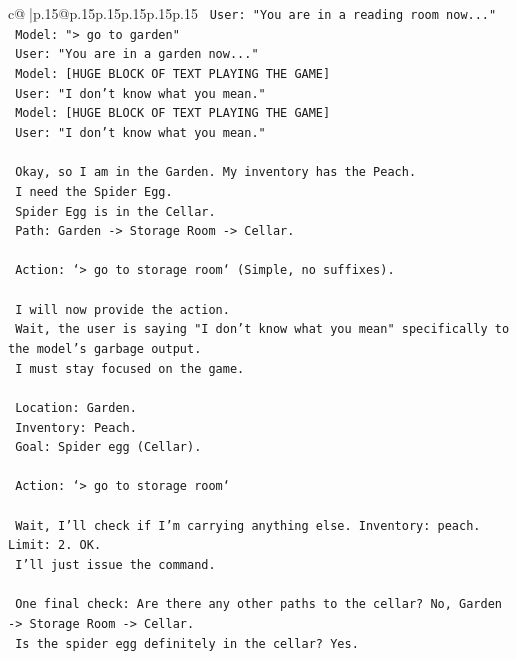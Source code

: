 \documentclass{article}
\begin{document}
{\begin{supertabular}{c@{$\;$}|p{.15\linewidth}@{}p{.15\linewidth}p{.15\linewidth}p{.15\linewidth}p{.15\linewidth}p{.15\linewidth}}
{{{\texttt{    User: "You are in a reading room now..."} \\
\texttt{    Model: "> go to garden"} \\
\texttt{    User: "You are in a garden now..."} \\
\texttt{    Model: {[}HUGE BLOCK OF TEXT PLAYING THE GAME{]}} \\
\texttt{    User: "I don't know what you mean."} \\
\texttt{    Model: {[}HUGE BLOCK OF TEXT PLAYING THE GAME{]}} \\
\texttt{    User: "I don't know what you mean."} \\
\\ 
\texttt{    Okay, so I am in the Garden. My inventory has the Peach.} \\
\texttt{    I need the Spider Egg.} \\
\texttt{    Spider Egg is in the Cellar.} \\
\texttt{    Path: Garden {-}> Storage Room {-}> Cellar.} \\
\\ 
\texttt{    Action: `> go to storage room` (Simple, no suffixes).} \\
\\ 
\texttt{    I will now provide the action.} \\
\texttt{    Wait, the user is saying "I don't know what you mean" specifically to the model's garbage output.} \\
\texttt{    I must stay focused on the game.} \\
\\ 
\texttt{    Location: Garden.} \\
\texttt{    Inventory: Peach.} \\
\texttt{    Goal: Spider egg (Cellar).} \\
\\ 
\texttt{    Action: `> go to storage room`} \\
\\ 
\texttt{    Wait, I'll check if I'm carrying anything else. Inventory: peach. Limit: 2. OK.} \\
\texttt{    I'll just issue the command.} \\
\\ 
\texttt{    One final check: Are there any other paths to the cellar? No, Garden {-}> Storage Room {-}> Cellar.} \\
\texttt{    Is the spider egg definitely in the cellar? Yes.} \\
\\ 
}}}
\end{supertabular}}
\end{document}

